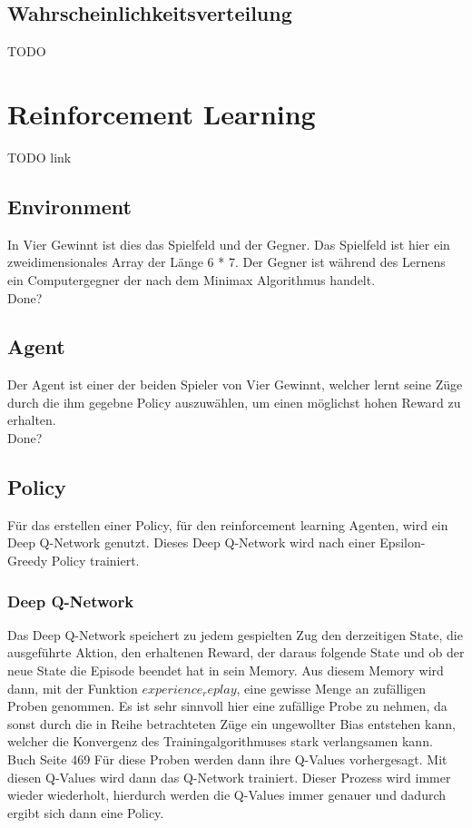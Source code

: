 \subsection{Wahrscheinlichkeitsverteilung}
\colorbox{red!30}{TODO}

\section{Reinforcement Learning}

\colorbox{red!30}{TODO link}

\subsection{Environment}
In Vier Gewinnt ist dies das Spielfeld und der Gegner. Das Spielfeld ist hier ein zweidimensionales Array der Länge 6 * 7. Der Gegner ist während des Lernens ein Computergegner der nach dem Minimax Algorithmus handelt. \\
\colorbox{red!30}{Done?}

\subsection{Agent}
Der Agent ist einer der beiden Spieler von Vier Gewinnt, welcher lernt seine Züge durch die ihm gegebne Policy auszuwählen, um einen möglichst hohen Reward zu erhalten.\\
\colorbox{red!30}{Done?} 

\subsection{Policy}
Für das erstellen einer Policy, für den reinforcement learning Agenten, wird ein Deep Q-Network genutzt. Dieses Deep Q-Network wird nach einer Epsilon-Greedy Policy trainiert.

\subsubsection{Deep Q-Network}
Das Deep Q-Network speichert zu jedem gespielten Zug den derzeitigen State, die ausgeführte Aktion, den erhaltenen Reward, der daraus folgende State und ob der neue State die Episode beendet hat in sein Memory. Aus diesem Memory wird dann, mit der Funktion $experience_replay$, eine gewisse Menge an zufälligen Proben genommen. Es ist sehr sinnvoll hier eine zufällige Probe zu nehmen, da sonst durch die in Reihe betrachteten Züge ein ungewollter Bias entstehen kann, welcher die Konvergenz des Trainingalgorithmuses stark verlangsamen kann.
\colorbox{red!30}{Buch Seite 469}
Für diese Proben werden dann ihre Q-Values vorhergesagt. Mit diesen Q-Values wird dann das Q-Network trainiert. Dieser Prozess wird immer wieder wiederholt, hierdurch werden die Q-Values immer genauer und dadurch ergibt sich dann eine Policy.


